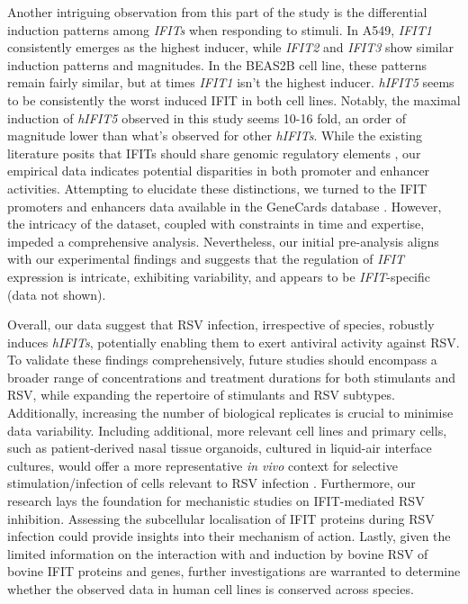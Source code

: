 Another intriguing observation from this part of the study is the differential induction patterns among \textit{IFITs} when responding to stimuli. In A549, \textit{IFIT1} consistently emerges as the highest inducer, while \textit{IFIT2} and \textit{IFIT3} show similar induction patterns and magnitudes. In the BEAS2B cell line, these patterns remain fairly similar, but at times \textit{IFIT1} isn't the highest inducer. \textit{hIFIT5} seems to be consistently the worst induced IFIT in both cell lines. Notably, the maximal induction of \textit{hIFIT5} observed in this study seems 10-16 fold, an order of magnitude lower than what's observed for other \textit{hIFITs}. While the existing literature posits that IFITs should share genomic regulatory elements \cite{Lou2009IFR-9/STAT2STAT1}, our empirical data indicates potential disparities in both promoter and enhancer activities. Attempting to elucidate these distinctions, we turned to the IFIT promoters and enhancers data available in the GeneCards database \cite{Stelzer2016TheAnalyses, Fishilevich2017GeneHancer:GeneCards}. However, the intricacy of the dataset, coupled with constraints in time and expertise, impeded a comprehensive analysis. Nevertheless, our initial pre-analysis aligns with our experimental findings and suggests that the regulation of \textit{IFIT} expression is intricate, exhibiting variability, and appears to be \textit{IFIT}-specific (data not shown).

Overall, our data suggest that RSV infection, irrespective of species, robustly induces \textit{hIFITs}, potentially enabling them to exert antiviral activity against RSV. To validate these findings comprehensively, future studies should encompass a broader range of concentrations and treatment durations for both stimulants and RSV, while expanding the repertoire of stimulants and RSV subtypes. Additionally, increasing the number of biological replicates is crucial to minimise data variability. Including additional, more relevant cell lines and primary cells, such as patient-derived nasal tissue organoids, cultured in liquid-air interface cultures, would offer a more representative \textit{in vivo} context for selective stimulation/infection of cells relevant to RSV infection \cite{Michi2021ACells, Rajan2022TheTherapeutics}. Furthermore, our research lays the foundation for mechanistic studies on IFIT-mediated RSV inhibition. Assessing the subcellular localisation of IFIT proteins during RSV infection could provide insights into their mechanism of action. Lastly, given the limited information on the interaction with and induction by bovine RSV of bovine IFIT proteins and genes, further investigations are warranted to determine whether the observed data in human cell lines is conserved across species.






